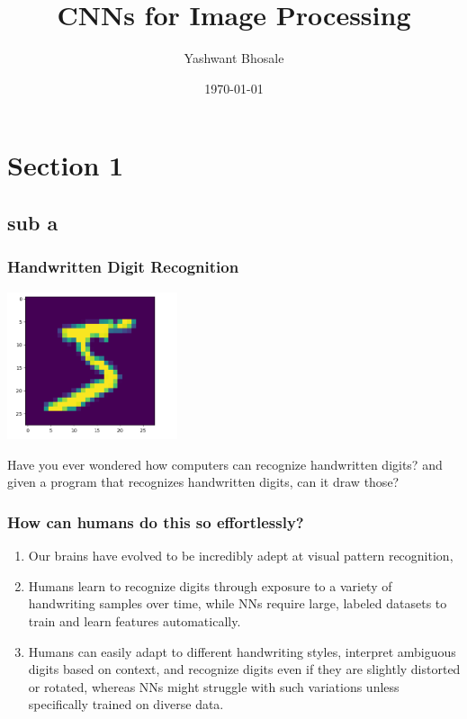\documentclass{beamer}
\title{CNNs for Image Processing}
\author{Yashwant Bhosale}
\institute{COEP Tech.}
\date{\today}
\begin{document}
\maketitle

\section{Section 1}
\subsection{sub a}

\begin{frame}
    \frametitle{Handwritten Digit Recognition}
    \begin{center}
        \includegraphics[width=5cm]{Screenshot from 2025-02-03 14-53-39.png}
    \end{center}
    Have you ever wondered how computers can recognize handwritten digits? and given a program that recognizes handwritten digits, can it draw those?
\end{frame}

\begin{frame}
    \frametitle{How can humans do this so effortlessly?}

    \begin{enumerate}
        \item Our brains have evolved to be incredibly adept at visual pattern recognition,
    
        \item Humans learn to recognize digits through exposure to a variety of handwriting samples over time, while NNs require large, labeled datasets to train and learn features automatically. 

        \item Humans can easily adapt to different handwriting styles, interpret ambiguous digits based on context, and recognize digits even if they are slightly distorted or rotated, whereas NNs might struggle with such variations unless specifically trained on diverse data. 

    \end{enumerate}
    
\end{frame}
\end{document}
